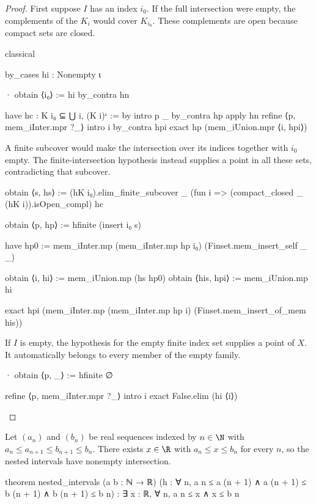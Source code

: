 \begin{proof}
  First suppose $I$ has an index $i_0$.
  If the full intersection were empty, the complements of the $K_i$ would cover $K_{i_0}$.
  These complements are open because compact sets are closed.

  \begin{lean}
    classical

    by_cases hi : Nonempty ι

    · obtain ⟨i₀⟩ := hi
      by_contra hn

      have hc : K i₀ ⊆ ⋃ i, (K i)ᶜ := by
        intro p _
        by_contra hp
        apply hn
        refine ⟨p, mem_iInter.mpr ?_⟩
        intro i
        by_contra hpi
        exact hp (mem_iUnion.mpr ⟨i, hpi⟩)
  \end{lean}

  A finite subcover would make the intersection over its indices together with $i_0$ empty.
  The finite-intersection hypothesis instead supplies a point in all these sets, contradicting that
  subcover.

  \begin{lean}
    obtain ⟨s, hs⟩ := (hK i₀).elim_finite_subcover _
      (fun i => (compact_closed _ (hK i)).isOpen_compl) hc

    obtain ⟨p, hp⟩ := hfinite (insert i₀ s)

    have hp0 := mem_iInter.mp (mem_iInter.mp hp i₀) (Finset.mem_insert_self _ _)

    obtain ⟨i, hi⟩ := mem_iUnion.mp (hs hp0)
    obtain ⟨his, hpi⟩ := mem_iUnion.mp hi

    exact hpi (mem_iInter.mp (mem_iInter.mp hp i) (Finset.mem_insert_of_mem his))
  \end{lean}

  If $I$ is empty, the hypothesis for the empty finite index set supplies a point of $X$.
  It automatically belongs to every member of the empty family.

  \begin{lean}
    · obtain ⟨p, _⟩ := hfinite ∅

      refine ⟨p, mem_iInter.mpr ?_⟩
      intro i
      exact False.elim (hi ⟨i⟩)
  \end{lean}

\end{proof}

\begin{lemma}
  \label{ma:lem:nested-intervals}
  Let $(a_n)$ and $(b_n)$ be real sequences indexed by $n\in\N$ with $a_n\leq a_{n+1}\leq
    b_{n+1}\leq b_n$.
  There exists $x\in\R$ with $a_n\leq x\leq b_n$ for every $n$, so the nested intervals have
  nonempty intersection.

  \begin{lean}
    theorem nested_intervals (a b : ℕ → ℝ)
        (h : ∀ n, a n ≤ a (n + 1) ∧ a (n + 1) ≤ b (n + 1) ∧ b (n + 1) ≤ b n) :
        ∃ x : ℝ, ∀ n, a n ≤ x ∧ x ≤ b n
  \end{lean}
\end{lemma}

